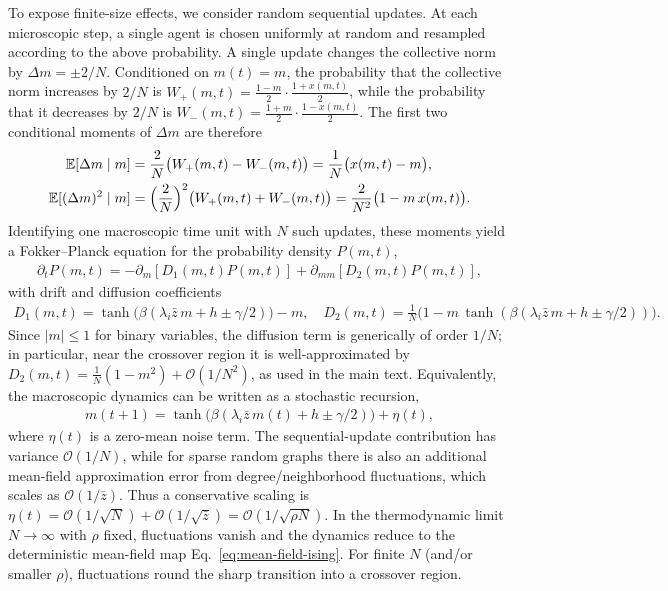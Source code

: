 \documentclass{article}
\theoremstyle{plain}
\theoremstyle{definition}
\theoremstyle{remark}
\begin{document}
To expose finite-size effects, we consider random sequential updates.
At each microscopic step, a single agent is chosen uniformly at random and resampled according to the above probability.
A single update changes the collective norm by $\Delta m=\pm 2/N$.
Conditioned on $m(t)=m$, the probability that the collective norm increases by $2/N$ is
$W_+(m,t)=\frac{1-m}{2}\cdot\frac{1+x(m,t)}{2}$,
while the probability that it decreases by $2/N$ is
$W_-(m,t)=\frac{1+m}{2}\cdot\frac{1-x(m,t)}{2}$.
The first two conditional moments of $\Delta m$ are therefore
\begin{align}
    \mathbb{E}[\Delta m\mid m]
&=\frac{2}{N}\bigl(W_+(m,t)-W_-(m,t)\bigr)
=\frac{1}{N}\bigl(x(m,t)-m\bigr), \\\nonumber
    \mathbb{E}[(\Delta m)^2\mid m]
&=\Bigl(\frac{2}{N}\Bigr)^2\bigl(W_+(m,t)+W_-(m,t)\bigr)
=\frac{2}{N^2}\bigl(1-m\,x(m,t)\bigr).
\end{align}
Identifying one macroscopic time unit with $N$ such updates, these moments yield a Fokker--Planck equation for the probability density $P(m,t)$,
\begin{align}
\partial_t P(m,t) = -\partial_m\left[D_1(m,t)P(m,t)\right]
+ \partial_{mm}\left[D_2(m,t)P(m,t)\right],
\end{align}
with drift and diffusion coefficients
\begin{align}\label{eq:app-stochastic-mf}
    D_1(m,t)=\tanh\!\bigl(\beta(\lambda_i \bar{z}\,m+h\pm\gamma/2)\bigr)-m, \quad
    D_2(m,t)=\frac{1}{N}\bigl(1-m\,\tanh(\beta(\lambda_i \bar{z}\,m+h\pm\gamma/2))\bigr).
\end{align}
Since $|m|\le 1$ for binary variables, the diffusion term is generically of order $1/N$; in particular, near the crossover region it is well-approximated by
$D_2(m,t)=\frac{1}{N}(1-m^2)+\mathcal{O}(1/N^2)$,
as used in the main text.
Equivalently, the macroscopic dynamics can be written as a stochastic recursion,
\begin{align}
    m(t+1)=\tanh\bigl(\beta(\lambda_i \bar{z}\,m(t)+h\pm\gamma/2)\bigr)+\eta(t),
\end{align}
where $\eta(t)$ is a zero-mean noise term.
The sequential-update contribution has variance $\mathcal{O}(1/N)$, while for sparse random graphs there is also an additional
mean-field approximation error from degree/neighborhood fluctuations, which scales as $\mathcal{O}(1/\bar{z})$.
Thus a conservative scaling is
$\eta(t)=\mathcal{O}(1/\sqrt{N})+\mathcal{O}(1/\sqrt{\bar{z}})=\mathcal{O}(1/\sqrt{\rho N})$.
In the thermodynamic limit $N\to\infty$ with $\rho$ fixed, fluctuations vanish and the dynamics reduce to the deterministic mean-field map
Eq.~\eqref{eq:mean-field-ising}.
For finite $N$ (and/or smaller $\rho$), fluctuations round the sharp transition into a crossover region.
\end{document}
